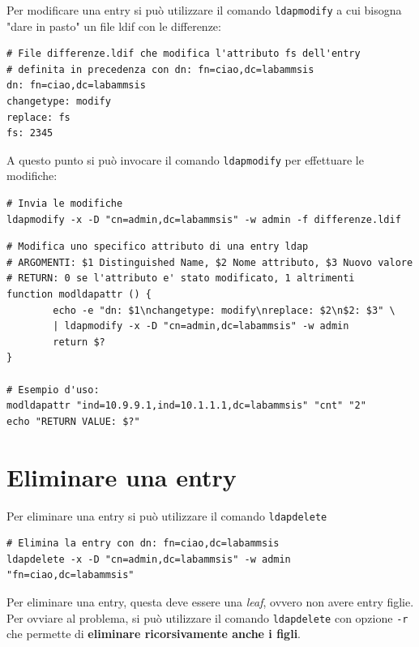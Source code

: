 \documentclass[a4paper]{report}
\newenvironment{ricordati}{\begin{tcolorbox}[fonttitle=\sffamily\bfseries\large,title=Ricordati,colframe=orange!75!white]}{\end{tcolorbox}}
\newenvironment{funzioni}{\begin{tcolorbox}[fonttitle=\sffamily\bfseries\large,title=Funzioni Utili,colframe=darkgreen!75!white]}{\end{tcolorbox}}
\newenvironment{code}{\begin{tcolorbox}[size=small]}{\end{tcolorbox}}
\begin{document}
Per modificare una entry si può utilizzare il comando \texttt{ldapmodify} a cui bisogna "dare in pasto" un file ldif con le differenze:

\begin{code}
\begin{lstlisting}
# File differenze.ldif che modifica l'attributo fs dell'entry
# definita in precedenza con dn: fn=ciao,dc=labammsis
dn: fn=ciao,dc=labammsis
changetype: modify
replace: fs
fs: 2345
\end{lstlisting}
\end{code}

A questo punto si può invocare il comando \texttt{ldapmodify} per effettuare le modifiche:
\begin{code}
\begin{lstlisting}
# Invia le modifiche
ldapmodify -x -D "cn=admin,dc=labammsis" -w admin -f differenze.ldif
\end{lstlisting}
\end{code}

\begin{funzioni}
\begin{lstlisting}
# Modifica uno specifico attributo di una entry ldap
# ARGOMENTI: $1 Distinguished Name, $2 Nome attributo, $3 Nuovo valore
# RETURN: 0 se l'attributo e' stato modificato, 1 altrimenti
function modldapattr () {
        echo -e "dn: $1\nchangetype: modify\nreplace: $2\n$2: $3" \
        | ldapmodify -x -D "cn=admin,dc=labammsis" -w admin
        return $?
}

# Esempio d'uso:
modldapattr "ind=10.9.9.1,ind=10.1.1.1,dc=labammsis" "cnt" "2"
echo "RETURN VALUE: $?"
\end{lstlisting}
\end{funzioni}

\section{Eliminare una entry}

Per eliminare una entry si può utilizzare il comando \texttt{ldapdelete}

\begin{code}
\begin{lstlisting}
# Elimina la entry con dn: fn=ciao,dc=labammsis
ldapdelete -x -D "cn=admin,dc=labammsis" -w admin "fn=ciao,dc=labammsis"
\end{lstlisting}
\end{code}

\begin{ricordati}
	Per eliminare una entry, questa deve essere una \textit{leaf}, ovvero non avere entry figlie. Per ovviare al problema, si può utilizzare il comando \texttt{ldapdelete} con opzione \texttt{-r} che permette di \textbf{eliminare ricorsivamente anche i figli}.
\end{ricordati}




\end{document}
